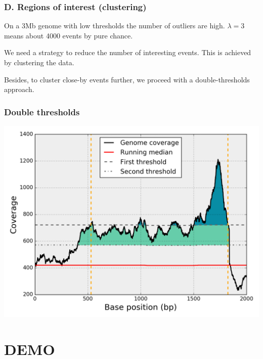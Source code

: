 \documentclass{beamer}
\begin{document}
\begin{frame}
\frametitle{D. Regions of interest (clustering)}

\begin{block}{}
On a 3Mb genome with low thresholds the number of outliers are high. 
$\lambda=3$ means about 4000 events by pure chance.
\end{block}

\begin{block}{}
We need a strategy to reduce the number of interesting events. This is 
achieved by clustering the data.
\end{block}

\begin{block}{}
Besides, to cluster close-by events further, we proceed with a 
double-thresholds 
approach.
\end{block}
 
\end{frame}


\begin{frame}
 \frametitle{Double thresholds}
\includegraphics[height=0.9\textheight, 
    width=1\textwidth]{images/double_threshold.png}
\end{frame}

\section{DEMO}
\end{document}
